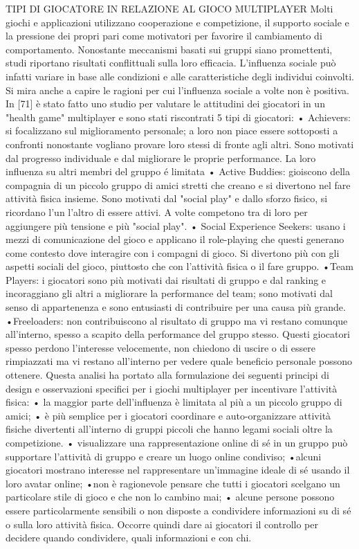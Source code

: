 TIPI DI GIOCATORE IN RELAZIONE AL GIOCO MULTIPLAYER
Molti giochi e applicazioni utilizzano cooperazione e competizione, il supporto sociale e la pressione dei propri pari come motivatori per favorire il cambiamento di comportamento.
Nonostante meccanismi basati sui gruppi siano promettenti, studi riportano risultati conflittuali sulla loro efficacia. L'influenza sociale può infatti variare in base alle condizioni e alle caratteristiche degli individui coinvolti.
Si mira anche a capire le ragioni per cui l'influenza sociale a volte non è positiva. In [71] è stato fatto uno studio per valutare le attitudini dei giocatori in un "health game" multiplayer e sono stati riscontrati 5 tipi di giocatori:
• Achievers: si focalizzano sul miglioramento personale; a loro non piace essere sottoposti a confronti nonostante vogliano provare loro stessi di fronte agli altri. Sono motivati dal progresso individuale e dal migliorare le proprie performance. La loro influenza su altri membri del gruppo é limitata
• Active Buddies: gioiscono della compagnia di un piccolo gruppo di amici stretti che creano e si divertono nel fare attività fisica insieme. Sono motivati dal "social play" e dallo sforzo fisico, si ricordano l'un l'altro di essere attivi. A volte competono tra di loro per aggiungere più tensione e più "social play".
• Social Experience Seekers: usano i mezzi di comunicazione del gioco e applicano il role-playing che questi generano come contesto dove interagire con i compagni di gioco. Si divertono più con gli aspetti sociali del gioco, piuttosto che con l'attività fisica o il fare gruppo.
•Team Players: i giocatori sono più motivati dai risultati di gruppo e dal ranking e incoraggiano gli altri a migliorare la performance del team; sono motivati dal senso di appartenenza e sono entusiasti di contribuire per una causa più grande.
•Freeloaders: non contribuiscono al risultato di gruppo ma vi restano comunque all'interno, spesso a scapito della performance del gruppo stesso.
Questi giocatori spesso perdono l'interesse velocemente, non chiedono di uscire o di essere rimpiazzati ma vi restano all'interno per vedere quale beneficio personale possono ottenere.
Questa analisi ha portato alla formulazione dei seguenti principi di design e osservazioni specifici per i giochi multiplayer per incentivare l'attività fisica:
• la maggior parte dell'influenza è limitata al più a un piccolo gruppo di amici;
• è più semplice per i giocatori coordinare e auto-organizzare attività fisiche divertenti all'interno di gruppi piccoli che hanno legami sociali oltre la competizione.
• visualizzare una rappresentazione online di sé in un gruppo può supportare l'attività di gruppo e creare un luogo online condiviso;
•alcuni giocatori mostrano interesse nel rappresentare un'immagine ideale di sé usando il loro avatar online;
•non è ragionevole pensare che tutti i giocatori scelgano un particolare stile di gioco e che non lo cambino mai;
• alcune persone possono essere particolarmente sensibili o non disposte a condividere informazioni su di sé o sulla loro attività fisica. Occorre quindi dare ai giocatori il controllo per decidere quando condividere, quali informazioni e con chi.


